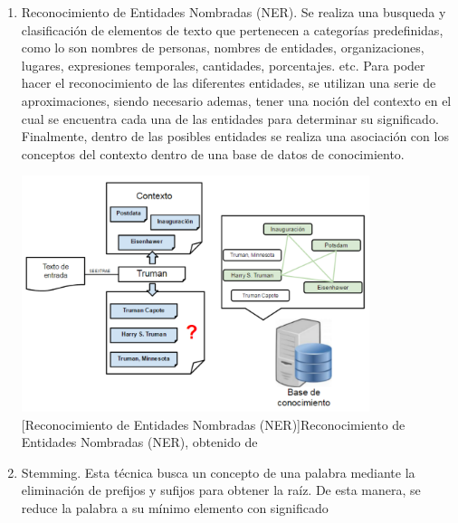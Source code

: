 \begin{enumerate}
\item Reconocimiento de Entidades Nombradas (NER). Se realiza una busqueda y clasificación de elementos de texto que pertenecen a categorías predefinidas, como lo son nombres de personas, nombres de entidades, organizaciones, lugares, expresiones temporales, cantidades, porcentajes. etc.
Para poder hacer el reconocimiento de las diferentes entidades, se utilizan una serie de aproximaciones, siendo necesario ademas, tener una noción del contexto en el cual se encuentra cada una de las entidades para determinar su significado. Finalmente, dentro de las posibles entidades se realiza una asociación con los conceptos del contexto dentro de una base de datos de conocimiento.
\begin{center}
    \includegraphics[width=0.8\textwidth]{Images/Cap 2/NER.png}
    [Reconocimiento de Entidades Nombradas (NER)]{Reconocimiento de Entidades Nombradas (NER), obtenido de \cite{ref47}}  %
\end{center}
\item Stemming. Esta técnica busca un concepto de una palabra mediante la eliminación de prefijos y sufijos para obtener la raíz. De esta manera, se reduce la palabra a su mínimo elemento con significado


\end{enumerate}
